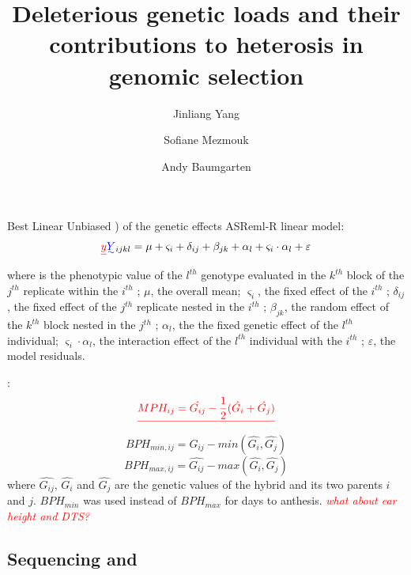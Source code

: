 \documentclass[9pt,twocolumn,twoside]{gsajnl}
\newcommand{\jri}[1]{\textcolor{red}{ \emph{ #1}} }  \title{Deleterious genetic loads and their contributions to heterosis in genomic selection}  \author[$\ast$, 1]{Jinliang Yang} \author[$\ast$, 1, 2]{Sofiane Mezmouk} \author[$\dagger$]{Andy Baumgarten}
\begin{document}
\DIFaddbegin {}\DIFaddend Best Linear Unbiased \DIFdelbegin {}\DIFdelend \DIFaddbegin {}\DIFaddend ) of the genetic effects \DIFdelbegin {}\DIFdelend \DIFaddbegin {}\DIFaddend ASReml-R \DIFdelbegin {}\DIFdelend \DIFaddbegin {}\DIFaddend linear model: 
\[\DIFdelbegin \DIFdel{y}\DIFdelend \DIFaddbegin \DIFadd{Y}\DIFaddend _{ijkl} = \mu + \varsigma_{i} + \delta_{ij} + \beta_{jk} + \alpha_{l} +  \varsigma_{i} \cdot \alpha_{l} + \varepsilon\]
where 
\DIFdelbegin {}\DIFdelend \DIFaddbegin {}\DIFaddend is the phenotypic value of the $l^{th}$ genotype evaluated in the $k^{th}$ block of the $j^{th}$ replicate within the $i^{th}$ \DIFdelbegin {}\DIFdelend \DIFaddbegin {}\DIFaddend ; 
$\mu$, the overall mean; 
$\varsigma_{i}$, the fixed effect of the $i^{th}$ \DIFdelbegin {}\DIFdelend \DIFaddbegin {}\DIFaddend ;
$\delta_{ij}$, the fixed effect of the $j^{th}$ replicate nested in the $i^{th}$ \DIFdelbegin {}\DIFdelend \DIFaddbegin {}\DIFaddend ; 
$\beta_{jk}$, the random effect of the $k^{th}$ block nested in the $j^{th}$ \DIFdelbegin {}\DIFdelend \DIFaddbegin {}\DIFaddend ; 
$\alpha_{l}$, the the fixed genetic effect  of the $l^{th}$ individual; 
$\varsigma_{i} \cdot \alpha_{l}$, the interaction effect of the $l^{th}$ individual with the $i^{th}$ \DIFdelbegin {}\DIFdelend \DIFaddbegin {}\DIFaddend ; 
$\varepsilon$, the model residuals. 

\DIFdelbegin {}\DIFdelend \DIFaddbegin {}\DIFaddend :
\DIFdelbegin \[\DIFdel{ MPH_{ij}=\hat{G_{ij}}-\frac{1}{2}(\hat{G_{i}}+\hat{G_{j}}) }\]
\DIFdelend \[ BPH_{min,ij}=\hat{G_{ij}}-min(\hat{G_{i}} ,\hat{G_{j}}) \] 
\[ BPH_{max,ij}=\hat{G_{ij}}-max(\hat{G_{i}} ,\hat{G_{j}}) \]
where $\hat{G_{ij}}$, $\hat{G_{i}}$ and $\hat{G_{j}}$ are the genetic values of the hybrid and its two parents $i$ and $j$. $BPH_{min}$ was used instead of $BPH_{max}$ for days to anthesis. \DIFdelbegin \DIFdelend \DIFaddbegin \jri{what about ear height and DTS?}
\DIFaddend 

\subsection*{Sequencing \DIFdelbegin {}\DIFdelend and \DIFdelbegin {}\DIFdelend \DIFaddbegin {}\DIFaddend }
\end{document}
